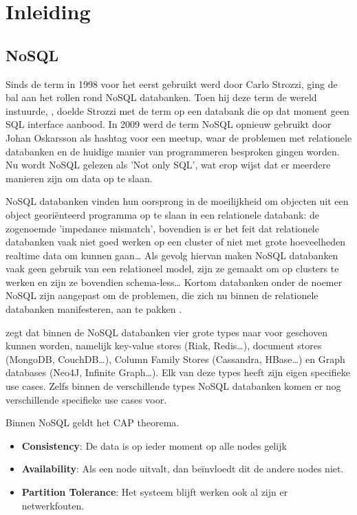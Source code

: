 \chapter{Inleiding}
\label{ch:inleiding}

\section{NoSQL}
Sinds de term in 1998 voor het eerst gebruikt werd door Carlo Strozzi, ging de bal aan het rollen rond NoSQL databanken.
Toen hij deze term de wereld instuurde, , doelde Strozzi met de term op een databank die op dat moment geen SQL interface aanbood.
In 2009 werd de term NoSQL opnieuw gebruikt door Johan Oskarsson als hashtag voor een meetup, waar de problemen met relationele databanken en de huidige manier van programmeren besproken gingen worden.
Nu wordt NoSQL gelezen als 'Not only SQL', wat erop wijst dat er meerdere manieren zijn om data op te slaan. \citep{Fowler2013Introduction}

NoSQL databanken vinden hun oorsprong in de moeilijkheid om objecten uit een object georiënteerd programma op te slaan in een relationele databank: de  zogenoemde 'impedance mismatch', bovendien is er het feit dat relationele databanken vaak niet goed werken op een cluster of niet met grote hoeveelheden realtime data om kunnen gaan\dots
Als gevolg hiervan maken NoSQL databanken vaak geen gebruik van een relationeel model, zijn ze gemaakt om op clusters te werken en zijn ze bovendien schema-less\dots
Kortom databanken onder de noemer NoSQL zijn aangepast om de problemen, die zich nu binnen de relationele databanken manifesteren, aan te pakken \citep{Fowler2012NoSQLDef}.

\cite{Sadalage2014OverviewNoSQL} zegt dat binnen de NoSQL databanken vier grote types naar voor geschoven kunnen worden, namelijk key-value stores (Riak, Redis\dots), document stores (MongoDB, CouchDB\dots), Column Family Stores (Cassandra, HBase\dots) en Graph databases (Neo4J, Infinite Graph\dots).
Elk van deze types heeft zijn eigen specifieke use cases.
Zelfs binnen de verschillende types NoSQL databanken komen er nog verschillende specifieke use cases voor.

Binnen NoSQL geldt het CAP theorema.
\begin{itemize}
	\item \textbf{Consistency}: De data is op ieder moment op alle nodes gelijk
	\item \textbf{Availability}: Als een node uitvalt, dan beïnvloedt dit de andere nodes niet.
	\item \textbf{Partition Tolerance}: Het systeem blijft werken ook al zijn er netwerkfouten.
\end{itemize}

